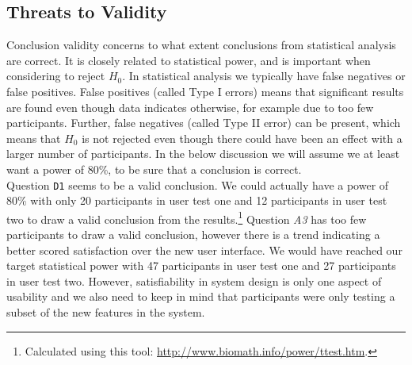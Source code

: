

\subsection{Threats to Validity}
\label{sub-sec:user-test-validity}
Conclusion validity concerns to what extent conclusions from statistical analysis are correct. It is closely related to statistical power, and is important when considering to reject $H_0$. In statistical analysis we typically have false negatives or false positives. False positives (called Type I errors) means that significant results are found even though data indicates otherwise, for example due to too few participants. Further, false negatives (called Type II error) can be present, which means that $H_0$ is not rejected even though there could have been an effect with a larger number of participants. In the below discussion we will assume we at least want a power of 80\%, to be sure that a conclusion is correct. \\

Question \texttt{D1} seems to be a valid conclusion. We could actually have a power of 80\% with only 20 participants in user test one and 12 participants in user test two to draw a valid conclusion from the results.\footnote{Calculated using this tool: \url{http://www.biomath.info/power/ttest.htm}.} Question \textit{A3} has too few participants to draw a valid conclusion, however there is a trend indicating a better scored satisfaction over the new user interface. We would have reached our target statistical power with 47 participants in user test one and 27 participants in user test two. However, satisfiability in system design is only one aspect of usability and we also need to keep in mind that participants were only testing a subset of the new features in the system. \\

